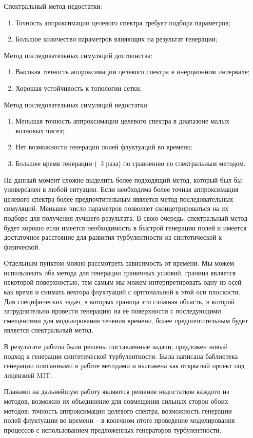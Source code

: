 Спектральный метод недостатки:
\begin{enumerate}
    \item Точность аппроксимации целевого спектра требует подбора параметров;
    \item Большое количество параметров влияющих на результат генерации;
\end{enumerate}

Метод последовательных симуляций достоинства:
\begin{enumerate}
    \item Высокая точность аппроксимации целевого спектра в инерционном интервале;
    \item Хорошая устойчивость к топологии сетки.
\end{enumerate}

Метод последовательных симуляций недостатки:
\begin{enumerate}
    \item Меньшая точность аппроксимации целевого спектра в диапазоне малых волновых чисел;
    \item Нет возможности генерации полей флуктуаций во времени;
    \item Большее время генерации (~3 раза) по сравнению со спектральным методом.
\end{enumerate}

На данный момент сложно выделить более подходящий метод, который был бы универсален в любой ситуации. Если необходима более точная аппроксимация целевого спектра более предпочтительным явялется метод последовательных симуляций. Меньшее число параметров позволяет сконцетрироваться на их подборе для получения лучшего результата. В свою очередь, спектральный метод будет хорошо если имеется необходимость в быстрой генерации полей и имеется достаточное расстояние для развития турбулентности из синтетической к физической. 

Отдельным пунктом можно рассмотреть зависимость от времени. Мы можем использовать оба метода для генерации граничных условий, граница является некоторой поверхностью, тем самым мы можем интерпретировать одну из осей как время и снимать вектора флуктуаций с ортгональной к этой оси плоскости. Для специфических задач, в которых граница это сложная область, в которой затруднительно провести генерацию на её поверхности с последующими смещениями для моделирования течения времени, более предпочтительным будет является спектральный метод.

В результате работы были решены поставленные задачи, предложен новый подход к генерации синтетической турбулентности. Была написана баблиотека генерации описанными в работе методами и выложена как открытый проект под лицензией MIT.

Планами на дальнейшую работу являются решение недостатков каждого из методов, возможно их объединение для совмещения сильных сторон обоих методов: точность аппроксимации целевого спектра, возможность генерации полей флуктуации во времени -- в конечном итоге проведение моделирования процессов с использованием предложенных генераторов турбулентности.
